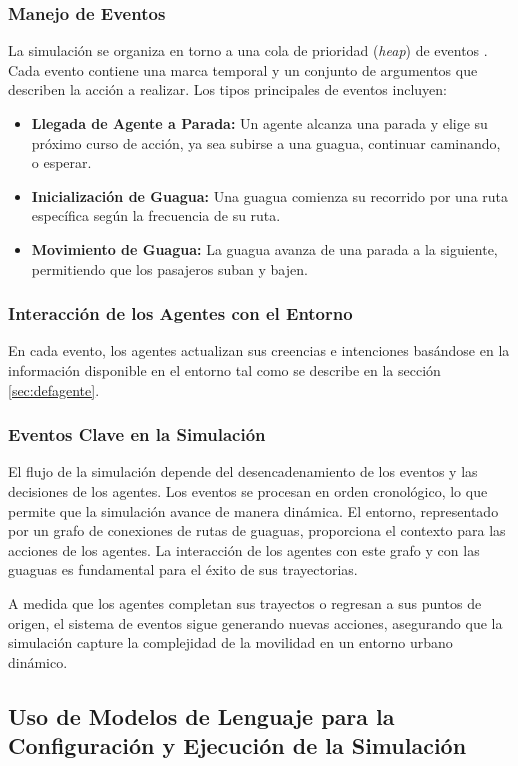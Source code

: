 \documentclass[a4paper,12pt]{article}
\begin{document}
\subsubsection{Manejo de Eventos}
La simulación se organiza en torno a una cola de prioridad (\textit{heap}) de eventos \cite{cormen2009introduction}. Cada evento contiene una marca temporal y un conjunto de argumentos que describen la acción a realizar. Los tipos principales de eventos incluyen:
\begin{itemize}
    \item \textbf{Llegada de Agente a Parada:} Un agente alcanza una parada y elige su próximo curso de acción, ya sea subirse a una guagua, continuar caminando, o esperar.
    \item \textbf{Inicialización de Guagua:} Una guagua comienza su recorrido por una ruta específica según la frecuencia de su ruta.
    \item \textbf{Movimiento de Guagua:} La guagua avanza de una parada a la siguiente, permitiendo que los pasajeros suban y bajen.
\end{itemize}

\subsubsection{Interacción de los Agentes con el Entorno}
En cada evento, los agentes actualizan sus creencias e intenciones basándose en la información disponible en el entorno tal como se describe en la secci\'on \ref{sec:defagente}.

\subsubsection{Eventos Clave en la Simulación}
El flujo de la simulación depende del desencadenamiento de los eventos y las decisiones de los agentes. Los eventos se procesan en orden cronológico, lo que permite que la simulación avance de manera dinámica. El entorno, representado por un grafo de conexiones de rutas de guaguas, proporciona el contexto para las acciones de los agentes. La interacción de los agentes con este grafo y con las guaguas es fundamental para el éxito de sus trayectorias.

A medida que los agentes completan sus trayectos o regresan a sus puntos de origen, el sistema de eventos sigue generando nuevas acciones, asegurando que la simulación capture la complejidad de la movilidad en un entorno urbano dinámico.

\subsection{Uso de Modelos de Lenguaje para la Configuración y Ejecución de la Simulaci\'on}
\end{document}

